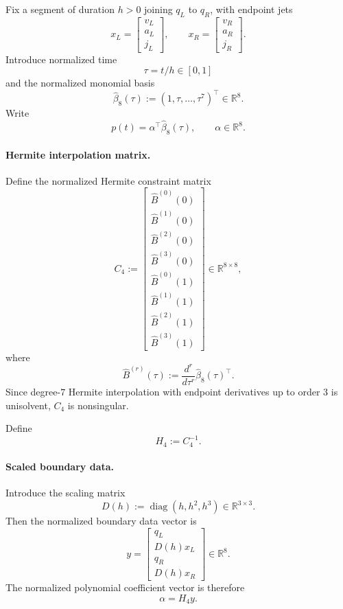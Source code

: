 Fix a segment of duration \(h>0\) joining \(q_L\) to \(q_R\), with endpoint jets
\[
x_L=
\begin{bmatrix}
v_L\\ a_L\\ j_L
\end{bmatrix},
\qquad
x_R=
\begin{bmatrix}
v_R\\ a_R\\ j_R
\end{bmatrix}.
\]
Introduce normalized time
\[
\tau=t/h\in[0,1]
\]
and the normalized monomial basis
\[
\widehat\beta_8(\tau):=(1,\tau,\dots,\tau^7)^\top\in\mathbb R^8.
\]
Write
\[
p(t)=\alpha^\top \widehat\beta_8(\tau),
\qquad \alpha\in\mathbb R^8.
\]

\paragraph{Hermite interpolation matrix.}
Define the normalized Hermite constraint matrix
\begin{equation}
\label{eq:phase4_C4}
C_4
:=
\begin{bmatrix}
\widehat B^{(0)}(0)\\
\widehat B^{(1)}(0)\\
\widehat B^{(2)}(0)\\
\widehat B^{(3)}(0)\\
\widehat B^{(0)}(1)\\
\widehat B^{(1)}(1)\\
\widehat B^{(2)}(1)\\
\widehat B^{(3)}(1)
\end{bmatrix}
\in\mathbb R^{8\times 8},
\end{equation}
where
\[
\widehat B^{(r)}(\tau)
:=
\frac{d^r}{d\tau^r}\widehat\beta_8(\tau)^\top.
\]
Since degree-\(7\) Hermite interpolation with endpoint derivatives up to order \(3\) is unisolvent,
\(C_4\) is nonsingular.

Define
\[
H_4:=C_4^{-1}.
\]

\paragraph{Scaled boundary data.}
Introduce the scaling matrix
\begin{equation}
\label{eq:phase4_Dh}
D(h):=\operatorname{diag}(h,h^2,h^3)\in\mathbb R^{3\times 3}.
\end{equation}
Then the normalized boundary data vector is
\begin{equation}
\label{eq:phase4_y_middle}
y
=
\begin{bmatrix}
q_L\\ D(h)x_L\\ q_R\\ D(h)x_R
\end{bmatrix}
\in\mathbb R^8.
\end{equation}
The normalized polynomial coefficient vector is therefore
\begin{equation}
\label{eq:phase4_alpha_middle}
\alpha = H_4 y.
\end{equation}

